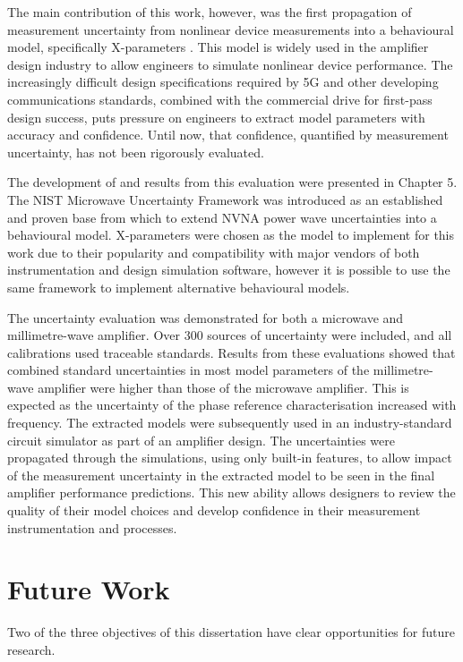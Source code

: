 \documentclass[../thesis/thesis.tex]{subfiles}
\begin{document}
\begin{refsection}
The main contribution of this work, however, was the first propagation of measurement uncertainty from nonlinear device measurements into a behavioural model, specifically X-parameters \cite{Stant_2018_TMTT}. This model is widely used in the amplifier design industry to allow engineers to simulate nonlinear device performance. The increasingly difficult design specifications required by 5G and other developing communications standards, combined with the commercial drive for first-pass design success, puts pressure on engineers to extract model parameters with accuracy and confidence. Until now, that confidence, quantified by measurement uncertainty, has not been rigorously evaluated.

The development of and results from this evaluation were presented in Chapter 5. The NIST Microwave Uncertainty Framework was introduced as an established and proven base from which to extend NVNA power wave uncertainties into a behavioural model. X-parameters were chosen as the model to implement for this work due to their popularity and compatibility with major vendors of both instrumentation and design simulation software, however it is possible to use the same framework to implement alternative behavioural models.

The uncertainty evaluation was demonstrated for both a microwave and millimetre-wave amplifier. Over 300 sources of uncertainty were included, and all calibrations used traceable standards. Results from these evaluations showed that combined standard uncertainties in most model parameters of the millimetre-wave amplifier were higher than those of the microwave amplifier. This is expected as the uncertainty of the phase reference characterisation increased with frequency. The extracted models were subsequently used in an industry-standard circuit simulator as part of an amplifier design. The uncertainties were propagated through the simulations, using only built-in features, to allow impact of the measurement uncertainty in the extracted model to be seen in the final amplifier performance predictions. This new ability allows designers to review the quality of their model choices and develop confidence in their measurement instrumentation and processes.

\section{Future Work}

Two of the three objectives of this dissertation have clear opportunities for future research.


\end{refsection}
\end{document}

